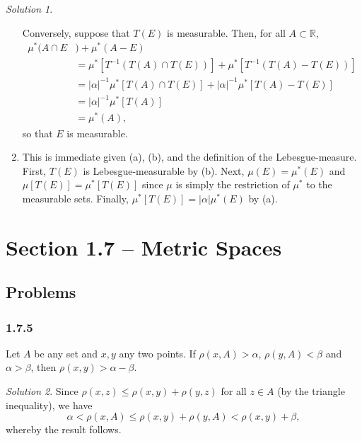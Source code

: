 \documentclass{report}
\newcommand{\bb}[1]{\mathbb{#1}}
\theoremstyle{remark}
\newtheorem*{solution}{Solution}
\begin{document}
\begin{solution}
\begin{enumerate}[label=(\alph*)]
      Conversely, suppose that $T(E)$ is measurable. Then, for all $A \subset \bb R$,
      \begin{equation*}
        \begin{split}
          \mu^*(A \cap E&) + \mu^*(A - E) \\
          &= \mu^*[T^{-1}(T(A) \cap T(E))] + \mu^*[T^{-1}(T(A) - T(E))] \\
          &= |\alpha|^{-1} \mu^*[T(A) \cap T(E)] + |\alpha|^{-1} \mu^*[T(A) - T(E)] \\
          &= |\alpha|^{-1} \mu^*[T(A)] \\
          &= \mu^*(A),
        \end{split}
      \end{equation*}
      so that $E$ is measurable.

    \item This is immediate given (a), (b), and the definition of the Lebesgue-measure. First, $T(E)$ is Lebesgue-measurable by (b). Next, $\mu(E) = \mu^*(E)$ and $\mu[T(E)] = \mu^*[T(E)]$ since $\mu$ is simply the restriction of $\mu^*$ to the measurable sets. Finally, $\mu^*[T(E)] = |\alpha| \mu^*(E)$ by (a).
  \end{enumerate}
\end{solution}


\section*{Section 1.7 -- Metric Spaces}

\subsection*{Problems}

\subsubsection*{1.7.5}
Let $A$ be any set and $x,y$ any two points. If $\rho(x,A) > \alpha$, $\rho(y,A) < \beta$ and $\alpha > \beta$, then $\rho(x,y) > \alpha - \beta$.

\begin{solution}
  Since $\rho(x,z) \le \rho(x,y) + \rho(y,z)$ for all $z \in A$ (by the triangle inequality), we have
  \begin{equation*}
    \alpha < \rho(x,A) \le \rho(x,y) + \rho(y,A) < \rho(x,y) + \beta,
  \end{equation*}
  whereby the result follows.
\end{solution}
\end{document}
